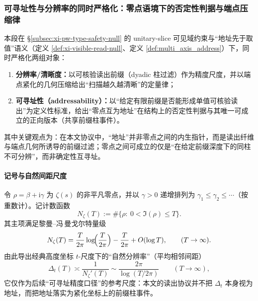 \subsubsection{可寻址性与分辨率的同时严格化：零点语境下的否定性判据与端点压缩律}\label{subsubsec:xi-addressability-resolution-law}
本段在 \S\ref{subsec:xi-pw-type-safety-null} 的 unitary-slice 可见域约束与“地址先于取值”语义（定义 \ref{def:xi-visible-read-null}、定义 \ref{def:multi_axis_address}）下，同时严格化两组对象：
\begin{enumerate}
  \item \textbf{分辨率/清晰度：}以可核验读出前缀（dyadic 柱过滤）作为精度尺度，并以端点紧化的几何压缩给出“扫描越久越清晰”的定量律；
  \item \textbf{可寻址性（addressability）：}以“给定有限前缀是否能形成单值可核验读出”为定义性标准，给出“零点互为地址”在结构上的否定性判据与其唯一可成立的正向版本（共享前缀柱事件）。
\end{enumerate}
其中关键观点为：在本文协议中，“地址”并非零点之间的内生指针，而是读出纤维与端点几何所诱导的前缀过滤；零点之间可成立的仅是“在给定前缀深度下的同柱不可分辨”，而非确定性互寻址。

\paragraph{记号与自然间距尺度}
令 \(\rho=\beta+\mathrm{i}\gamma\) 为 \(\zeta(s)\) 的非平凡零点，并以 \(\gamma>0\) 递增排列为 \(\gamma_1\le\gamma_2\le\cdots\)（按重数计）。记计数函数
\[
N_\zeta(T):=\#\{\rho:\ 0<\Im(\rho)\le T\}.
\]
其主项满足黎曼--冯\,曼戈尔特量级
\[
N_\zeta(T)=\frac{T}{2\pi}\log\!\Bigl(\frac{T}{2\pi}\Bigr)-\frac{T}{2\pi}+O(\log T),
\qquad(T\to\infty).
\]
由此导出经典高度坐标 \(t\)-尺度下的“自然分辨率”（平均相邻间距）
\[
\Delta_t(T)\asymp \frac{1}{N_\zeta'(T)}\sim \frac{2\pi}{\log(T/2\pi)}\qquad(T\to\infty),
\]
它仅作为后续“可寻址精度口径”的参考尺度：本文的读出协议并不把 \(\Delta_t\) 本身视为地址，而把地址落实为紧化坐标上的前缀柱事件。

